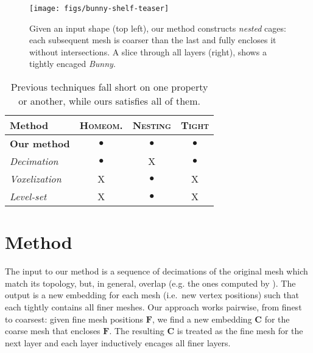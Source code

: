 \documentclass{cgyrf15}
\newcommand{\ra}[1]{\renewcommand{\arraystretch}{#1}}
\newcommand{\NO}{{\color{red}\textsf{X}}}
\newcommand{\YES}{$\bullet$}
\begin{document}
\begin{figure}[t]
  \texttt{[image: figs/bunny-shelf-teaser]}
  \caption{Given an input shape (top left), our method constructs \emph{nested} cages:
each subsequent mesh is coarser than the last and fully encloses it without
intersections. A slice through all layers (right), shows a tightly
encaged \emph{Bunny}.
  }
  \label{fig:bunny-shelf-teaser}
\end{figure}

\begin{table}
\centering
\ra{1.0}
\setlength{\tabcolsep}{5.5pt}
\begin{tabularx}{\linewidth}{X c c c}
\rowcolor{white}
\toprule
Method               & \textsc{Homeom.} & \textsc{Nesting}& \textsc{Tight} \\
\midrule                                                                       
\textbf{Our method}  & \YES                  & \YES            & \YES           \\
\emph{Decimation}                                                               
                     & \YES                  & \NO             & \YES           \\
\emph{Voxelization}                                                             
                     & \NO                   & \YES            & \NO            \\
\emph{Level-set}                                                                
                     & \NO                   & \YES            & \NO            \\
\bottomrule
\end{tabularx}
\caption{
Previous techniques fall short
on one property or another, while ours satisfies all of them.}
\label{tab:feature-chart}
\end{table}

\section{Method}

The input to our method is a sequence of decimations of the original mesh which
match its topology, but, in general, overlap 
(e.g. the ones computed by \cite{cgal}). The output is a new embedding for
each mesh (i.e.\ new vertex positions) such that each tightly contains all finer
meshes. Our approach works pairwise, from finest to coarsest: given fine mesh positions $\mathbf{F}$,
we find a new embedding $\mathbf{C}$ for the coarse mesh that encloses $\mathbf{F}$. The resulting $\mathbf{C}$ is treated as the fine mesh for the next layer and each layer inductively encages all finer layers.
\end{document}
